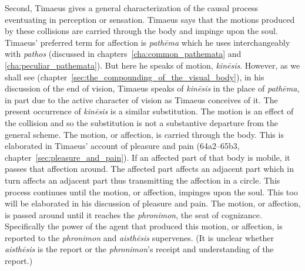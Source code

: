 Second, Timaeus gives a general characterization of the causal process eventuating in perception or sensation. Timaeus says that the motions produced by these collisions are carried through the body and impinge upon the soul. Timaeus' preferred term for affection is \emph{pathēma} which he uses interchangeably with \emph{pathos} (discussed in chapters~\ref{cha:common_pathemata} and \ref{cha:peculiar_pathemata}). But here he speaks of motion, \emph{kinēsis}. However, as we shall see (chapter~\ref{sec:the_compounding_of_the_visual_body}), in his discussion of the end of vision, Timaeus speaks of \emph{kinēsis} in the place of \emph{pathēma}, in part due to the active character of vision as Timaeus conceives of it. The present occurrence of \emph{kinēsis} is a similar substitution. The motion is an effect of the collision and so the substitution is not a substantive departure from the general scheme. The motion, or affection, is carried through the body. This is elaborated in Timaeus' account of pleasure and pain (64a2–65b3, chapter~\ref{sec:pleasure_and_pain}). If an affected part of that body is mobile, it passes that affection around. The affected part affects an adjacent part which in turn affects an adjacent part thus transmitting the affection in a circle. This process continues until the motion, or affection, impinges upon the soul. This too will be elaborated in his discussion of pleasure and pain. The motion, or affection, is passed around until it reaches the \emph{phronimon}, the seat of cognizance. Specifically the power of the agent that produced this motion, or affection, is reported to the \emph{phronimon} and \emph{aisthēsis} supervenes. (It is unclear whether \emph{aisthēsis} is the report or the \emph{phronimon}'s receipt and understanding of the report.)

